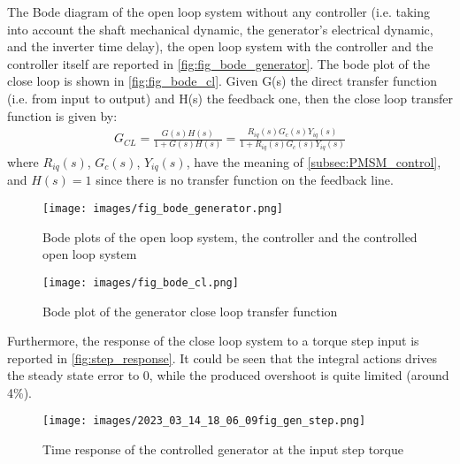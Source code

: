 The Bode diagram of the open loop system without any controller (i.e. taking into account the shaft mechanical dynamic, the generator's electrical dynamic, and the inverter time delay), the open loop system with the controller and the controller itself are reported in \autoref{fig:fig_bode_generator}. The bode plot of the close loop is shown in \autoref{fig:fig_bode_cl}. Given G(s) the direct transfer function (i.e. from input to output) and H(s) the feedback one, then the close loop transfer function is given by:
 \begin{gather}
     G_{CL}=\frac{G(s)H(s)}{1+G(s)H(s)}=\frac{R_{iq}(s)G_c(s)Y_{iq}(s)}{1+R_{iq}(s)G_c(s)Y_{iq}(s)}
     \label{eq:close_loop_TF}
 \end{gather}
 where $R_{iq}(s)$, $G_c(s)$, $Y_{iq}(s)$, have the meaning of \autoref{subsec:PMSM_control}, and $H(s)=1$ since there is no transfer function on the feedback line.
 
\begin{figure}[htb]
    \centering
    \texttt{[image: images/fig\_bode\_generator.png]}
    \caption{Bode plots of the open loop system, the controller and the controlled open loop system}
    \label{fig:fig_bode_generator}
 \end{figure}

 \begin{figure}[htb]
    \centering
    \texttt{[image: images/fig\_bode\_cl.png]}
    \caption{Bode plot of the generator close loop transfer function}
    \label{fig:fig_bode_cl}
 \end{figure}

Furthermore, the response of the close loop system to a torque step input is reported in \autoref{fig:step_response}. It could be seen that the integral actions drives the steady state error to 0, while the produced overshoot is quite limited (around 4\%).
 \begin{figure}[htb]
    \centering
    \texttt{[image: images/2023\_03\_14\_18\_06\_09fig\_gen\_step.png]}
    \caption{Time response of the controlled generator at the input step torque}
    \label{fig:step_response}
\end{figure}


